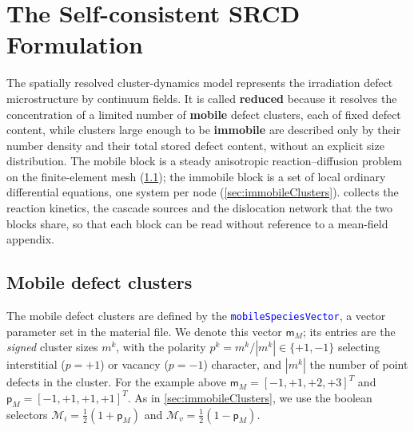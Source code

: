 \documentclass{article}
\newcommand{\textttclr}[1]{\textcolor{blue}{\texttt{#1}}}
\newcommand{\spvec}[1]{\bm{\mathsf{#1}}}   %
\begin{document}
\section{The Self-consistent SRCD Formulation}
\label{sec:SRCD}

The spatially resolved cluster-dynamics model represents the irradiation defect
microstructure by continuum fields. It is called \textbf{reduced} because it
resolves the concentration of a limited number of \textbf{mobile} defect
clusters, each of fixed defect content, while clusters large enough to be
\textbf{immobile} are described only by their number density and their total
stored defect content, without an explicit size distribution. The mobile block
is a steady anisotropic reaction--diffusion problem on the finite-element mesh
(\cref{sec:mobile}); the immobile block is a set of local ordinary differential
equations, one system per node (\cref{sec:immobileClusters}).
 collects the reaction kinetics, the cascade sources and the
dislocation network that the two blocks share, so that each block can be read
without reference to a mean-field appendix.

\subsection{Mobile defect clusters}
\label{sec:mobile}

The mobile defect clusters are defined by the \textttclr{mobileSpeciesVector}, a vector parameter set in the material file. We denote this vector $\spvec{m}_M$; its entries are the \emph{signed} cluster sizes $m^k$, with the polarity $p^k=m^k/|m^k|\in\{+1,-1\}$ selecting interstitial ($p=+1$) or vacancy ($p=-1$) character, and $|m^k|$ the number of point defects in the cluster. For the example above $\spvec{m}_M=[-1,+1,+2,+3]^T$ and $\spvec{p}_M=[-1,+1,+1,+1]^T$. As in \cref{sec:immobileClusters}, we use the boolean selectors $\mathcal{M}_i=\tfrac12(1+\spvec{p}_M)$ and $\mathcal{M}_v=\tfrac12(1-\spvec{p}_M)$.
\end{document}
